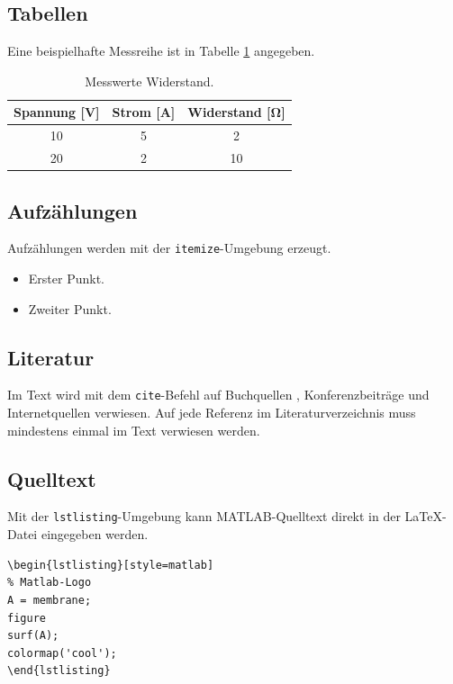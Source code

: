 \subsection{Tabellen}
Eine beispielhafte Messreihe ist in Tabelle \ref{tab:messwerte} angegeben.
\begin{table}[htb]
    \centering
    \caption{Messwerte Widerstand.}
    \label{tab:messwerte}
    \begin{tabular}{ccc}
        \toprule
        Spannung [\si{\volt}] & Strom [\si{\ampere}] & Widerstand [\si{\ohm}] \\
        \midrule
        \num{10} & \num{5} & \num{2} \\
        \num{20} & \num{2} & \num{10} \\
        \bottomrule
    \end{tabular}
    
\end{table}


\subsection{Aufzählungen}
Aufzählungen werden mit der \verb|itemize|-Umgebung erzeugt.
\begin{itemize}
    \item Erster Punkt.
    \item Zweiter Punkt.
\end{itemize}


\subsection{Literatur}
Im Text wird mit dem \verb|cite|-Befehl auf Buchquellen \cite{bronstein}, Konferenzbeiträge \cite{kalman} und Internetquellen \cite{atmel} verwiesen. Auf jede Referenz im Literaturverzeichnis muss mindestens einmal im Text verwiesen werden.


\subsection{Quelltext}

Mit der \verb|lstlisting|-Umgebung kann MATLAB-Quelltext direkt in der \LaTeX-Datei eingegeben werden.

\begin{verbatim}
\begin{lstlisting}[style=matlab]
% Matlab-Logo
A = membrane; 
figure 
surf(A); 
colormap('cool');
\end{lstlisting}
\end{verbatim}

